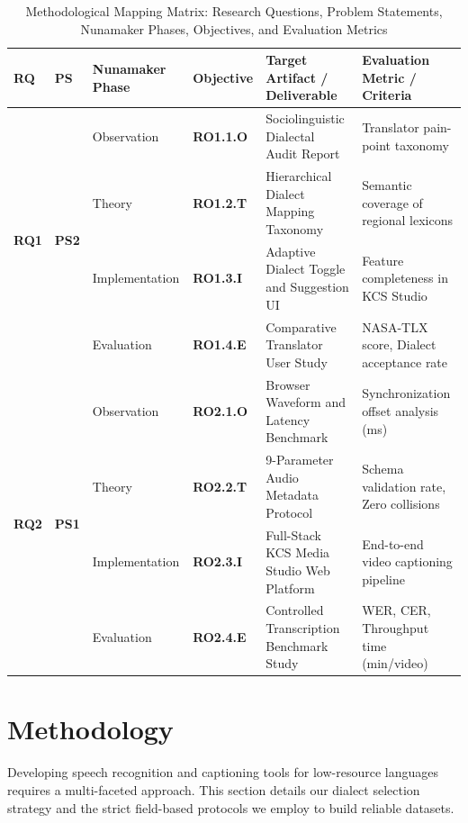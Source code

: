 \documentclass[a4paper,11pt]{article}
\begin{document}
\begin{table}[t]
\centering
\small
\caption{Methodological Mapping Matrix: Research Questions, Problem Statements, Nunamaker Phases, Objectives, and Evaluation Metrics}
\label{tab:methodology_mapping_main}
\begin{tabular}{p{1.0cm} p{1.0cm} p{2.6cm} p{1.6cm} p{5.3cm} p{4.0cm}}
\toprule
\textbf{RQ} & \textbf{PS} & \textbf{Nunamaker Phase} & \textbf{Objective} & \textbf{Target Artifact / Deliverable} & \textbf{Evaluation Metric / Criteria} \\
\midrule
\multirow{4}{*}{\textbf{RQ1}} & \multirow{4}{*}{\textbf{PS2}} & Observation & \textbf{RO1.1.O} & Sociolinguistic Dialectal Audit Report & Translator pain-point taxonomy \\
\addlinespace
& & Theory & \textbf{RO1.2.T} & Hierarchical Dialect Mapping Taxonomy & Semantic coverage of regional lexicons \\
\addlinespace
& & Implementation & \textbf{RO1.3.I} & Adaptive Dialect Toggle and Suggestion UI & Feature completeness in KCS Studio \\
\addlinespace
& & Evaluation & \textbf{RO1.4.E} & Comparative Translator User Study & NASA-TLX score, Dialect acceptance rate \\
\midrule
\multirow{4}{*}{\textbf{RQ2}} & \multirow{4}{*}{\textbf{PS1}} & Observation & \textbf{RO2.1.O} & Browser Waveform and Latency Benchmark & Synchronization offset analysis (ms) \\
\addlinespace
& & Theory & \textbf{RO2.2.T} & 9-Parameter Audio Metadata Protocol & Schema validation rate, Zero collisions \\
\addlinespace
& & Implementation & \textbf{RO2.3.I} & Full-Stack KCS Media Studio Web Platform & End-to-end video captioning pipeline \\
\addlinespace
& & Evaluation & \textbf{RO2.4.E} & Controlled Transcription Benchmark Study & WER, CER, Throughput time (min/video) \\
\bottomrule
\end{tabular}
\end{table}

\section{Methodology}
\label{sec:methodology}

Developing speech recognition and captioning tools for low-resource languages requires a multi-faceted approach. This section details our dialect selection strategy and the strict field-based protocols we employ to build reliable datasets.
\end{document}
